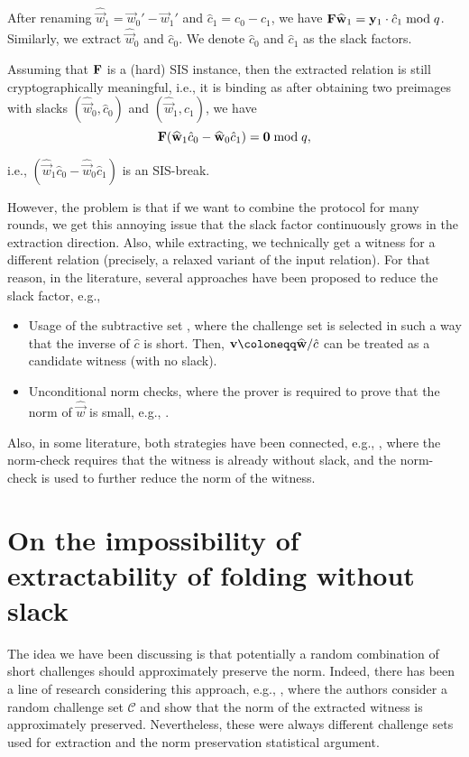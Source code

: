 After renaming $\widehat{\vec{w}}_1 = \vec{w}_0' - \vec{w}_1'$ and $\hat{c}_1 = c_0 - c_1$, we have $\mathbf{F} \widehat{{{\mathbf{w}}}}_1 = {{\mathbf{y}}}_1 \cdot \hat{c}_1 \bmod q$. Similarly, we extract $\widehat{\vec{w}}_0$ and $\hat{c}_0$. We denote $\hat{c}_0$ and $\hat{c}_1$ as the slack factors.

Assuming that $\mathbf{F}$ is a (hard) SIS instance, then the extracted relation is still cryptographically meaningful, i.e., it is binding as after obtaining two preimages with slacks $(\widehat{\vec{w}}_0, \hat{c}_0)$ and $(\widehat{\vec{w}}_1, \hat{c}_1)$, we have 
\[ 
    \mathbf{F} (\widehat{{{\mathbf{w}}}}_1 \hat{c}_0 - \widehat{{{\mathbf{w}}}}_0 \hat{c}_1) = {{\mathbf{0}}} \bmod q,
\] 

i.e., $(\widehat{\vec{w}}_1 \hat{c}_0 - \widehat{\vec{w}}_0 \hat{c}_1)$ is an SIS-break.

However, the problem is that if we want to combine the protocol for many rounds, we get this annoying issue that the slack factor continuously grows in the extraction direction. Also, while extracting, we technically get a witness for a different relation (precisely, a relaxed variant of the input relation). For that reason, in the literature, several approaches have been proposed to reduce the slack factor, e.g.,

\begin{itemize}
    \item Usage of the subtractive set \cite{C:AlbLai21,C:CinLaiMal23,EPRINT:BonChe24}, where the challenge set is selected in such a way that the inverse of $\hat{c}$ is short. Then, $\vec{v} \defeq \widehat{\vec{w}} / \hat{c}$ can be treated as a candidate witness (with no slack).
    \item Unconditional norm checks, where the prover is required to prove that the norm of $\widehat{\vec{w}}$ is small, e.g., \cite{RR,EPRINT:BonChe24}. 
\end{itemize}

Also, in some literature, both strategies have been connected, e.g., \cite{AC:KLNO24,CC}, where the norm-check requires that the witness is already without slack, and the norm-check is used to further reduce the norm of the witness. 


\section{On the impossibility of extractability of folding without slack}

The idea we have been discussing is that potentially a random combination of short challenges should approximately preserve the norm. Indeed, there has been a line of research considering this approach, e.g., \cite{EC:GenHalLyu22,C:BeuSei23}, where the authors consider a random challenge set $\mathcal{C}$ and show that the norm of the extracted witness is approximately preserved. Nevertheless, these were always different challenge sets used for extraction and the norm preservation statistical argument. 

